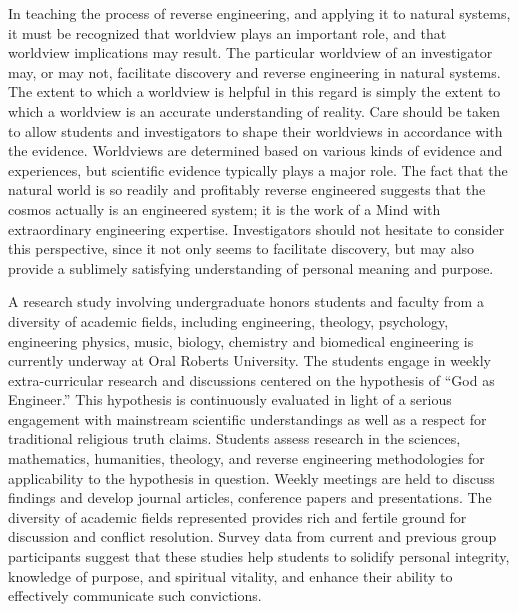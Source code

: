 In teaching the process of reverse engineering, and applying it to
natural systems, it must be recognized that worldview plays an
important role, and that worldview implications may result. The
particular worldview of an investigator may, or may not, facilitate
discovery and reverse engineering in natural systems. The extent to
which a worldview is helpful in this regard is simply the extent to
which a worldview is an accurate understanding of reality. Care should
be taken to allow students and investigators to shape their worldviews
in accordance with the evidence. Worldviews are determined based on
various kinds of evidence and experiences, but scientific evidence
typically plays a major role. The fact that the natural world is so
readily and profitably reverse engineered suggests that the cosmos
actually is an engineered system; it is the work of a Mind with
extraordinary engineering expertise. Investigators should not hesitate
to consider this perspective, since it not only seems to facilitate
discovery, but may also provide a sublimely satisfying understanding of
personal meaning and purpose.

A research study involving undergraduate honors students and faculty
from a diversity of academic fields, including engineering, theology,
psychology, engineering physics, music, biology, chemistry and
biomedical engineering is currently underway at Oral Roberts
University.\citep{halsmerbeck2012} The students engage in weekly
extra-curricular research and discussions centered on the hypothesis of
“God as Engineer.” This hypothesis is continuously evaluated in light
of a serious engagement with mainstream scientific understandings as
well as a respect for traditional religious truth claims. Students
assess research in the sciences, mathematics, humanities, theology, and
reverse engineering methodologies for applicability to the hypothesis
in question. Weekly meetings are held to discuss findings and develop
journal articles, conference papers and presentations. The diversity of
academic fields represented provides rich and fertile ground for
discussion and conflict resolution. Survey data from current and
previous group participants suggest that these studies help students to
solidify personal integrity, knowledge of purpose, and spiritual
vitality, and enhance their ability to effectively communicate such
convictions.

